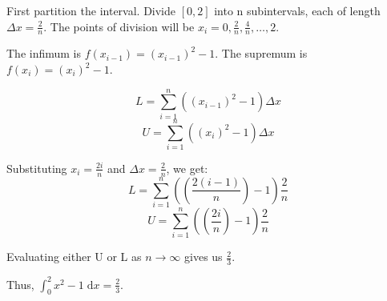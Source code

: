 \documentclass[answers]{exam}
\theoremstyle{remark}
\theoremstyle{definition}
\newcommand{\dx}{\;\mathrm{d}x}
\begin{document}
\begin{questions}
\begin{solution}

First partition the interval. Divide $[0, 2]$ into n subintervals,
each of length $\Delta x = \frac{2}{n}$.
The points of division will be $x_i = 0, \frac{2}{n}, \frac{4}{n}, \dots, 2$.

The infimum is $f(x_{i-1}) = (x_{i-1})^2 - 1$.
The supremum is $f(x_i) = (x_i)^2 - 1$.

\[L = \sum_{i = 1}^{n} ((x_{i-1})^2 - 1) \Delta x\]
\[U = \sum_{i = 1}^{n} ((x_i)^2 - 1) \Delta x\]

Substituting $x_i = \frac{2i}{n}$ and $\Delta x = \frac{2}{n}$, we get:
\[L = \sum_{i = 1}^{n} \left(\left(\frac{2(i-1)}{n}\right)-1\right)\frac{2}{n}\]
\[U = \sum_{i = 1}^{n} \left(\left(\frac{2i}{n}\right)-1\right)\frac{2}{n}\]

Evaluating either U or L as $n \to \infty$ gives us $\frac{2}{3}$.

Thus, $\int_{0}^2 x^2-1 \dx = \frac{2}{3}$.

\end{solution}

\end{questions}
\end{document}
